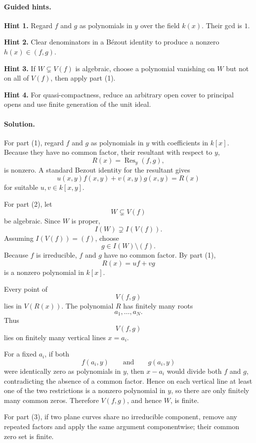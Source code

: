 \paragraph{Guided hints.}
\textbf{Hint 1.} Regard \(f\) and \(g\) as polynomials in \(y\) over the field
\(k(x)\).  Their gcd is \(1\).

\textbf{Hint 2.} Clear denominators in a Bézout identity to produce a nonzero
\(h(x)\in(f,g)\).

\textbf{Hint 3.} If \(W\subsetneq V(f)\) is algebraic, choose a polynomial vanishing on
\(W\) but not on all of \(V(f)\), then apply part (1).

\textbf{Hint 4.} For quasi-compactness, reduce an arbitrary open cover to principal opens
and use finite generation of the unit ideal.

\paragraph{Solution.}
For part (1), regard \(f\) and \(g\) as polynomials in \(y\) with coefficients in \(k[x]\).
Because they have no common factor, their resultant with respect to \(y\),
\[
R(x)=\operatorname{Res}_y(f,g),
\]
is nonzero.  A standard Bezout identity for the resultant gives
\[
u(x,y)f(x,y)+v(x,y)g(x,y)=R(x)
\]
for suitable \(u,v\in k[x,y]\).

For part (2), let
\[
W\subsetneq V(f)
\]
be algebraic.  Since \(W\) is proper,
\[
I(W)\supsetneq I(V(f)).
\]
Assuming \(I(V(f))=(f)\), choose
\[
g\in I(W)\setminus(f).
\]
Because \(f\) is irreducible, \(f\) and \(g\) have no common factor.  By part (1),
\[
R(x)=uf+vg
\]
is a nonzero polynomial in \(k[x]\).

Every point of
\[
V(f,g)
\]
lies in \(V(R(x))\).  The polynomial \(R\) has finitely many roots
\[
a_1,\dots,a_N.
\]
Thus
\[
V(f,g)
\]
lies on finitely many vertical lines \(x=a_i\).

For a fixed \(a_i\), if both
\[
f(a_i,y)
\qquad\text{and}\qquad
g(a_i,y)
\]
were identically zero as polynomials in \(y\), then \(x-a_i\) would divide both \(f\) and
\(g\), contradicting the absence of a common factor.  Hence on each vertical line at least
one of the two restrictions is a nonzero polynomial in \(y\), so there are only finitely
many common zeros.  Therefore \(V(f,g)\), and hence \(W\), is finite.

For part (3), if two plane curves share no irreducible component, remove any repeated
factors and apply the same argument componentwise; their common zero set is finite.

